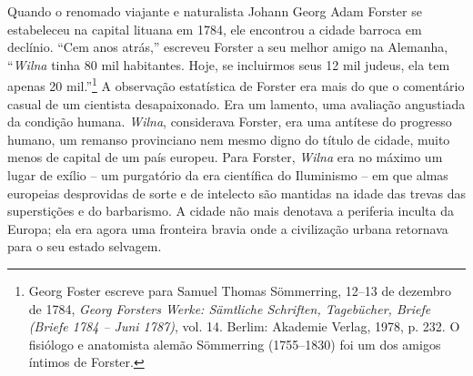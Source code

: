 Quando o renomado viajante e naturalista Johann Georg Adam Forster se
estabeleceu na capital lituana em 1784, ele encontrou a cidade barroca
em declínio. ``Cem anos atrás,'' escreveu Forster a seu melhor amigo na
Alemanha, ``\textit{Wilna} tinha 80 mil habitantes. Hoje, se incluirmos seus 12
mil judeus, ela tem apenas 20 mil.''\footnote{Georg Foster escreve para Samuel Thomas Sömmerring, 12--13 de dezembro de 1784, \textit{Georg Forsters Werke: Sämtliche Schriften, Tagebücher, Briefe (Briefe 1784 -- Juni 1787)}, vol. 14. Berlim: Akademie Verlag, 1978, p. 232. O fisiólogo e anatomista alemão Sömmerring (1755--1830) foi um dos amigos íntimos de Forster.} A observação estatística de Forster era mais do que o comentário casual de um cientista
desapaixonado. Era um lamento, uma avaliação angustiada da condição
humana. \textit{Wilna}, considerava Forster, era uma antítese do progresso
humano, um remanso provinciano nem mesmo digno do título de cidade,
muito menos de capital de um país europeu. Para Forster, \textit{Wilna} era no
máximo um lugar de exílio -- um purgatório da era científica do
Iluminismo -- em que almas europeias desprovidas de sorte e de intelecto
são mantidas na idade das trevas das superstições e do barbarismo. A
cidade não mais denotava a periferia inculta da Europa; ela era agora
uma fronteira bravia onde a civilização urbana retornava para o seu
estado selvagem.

